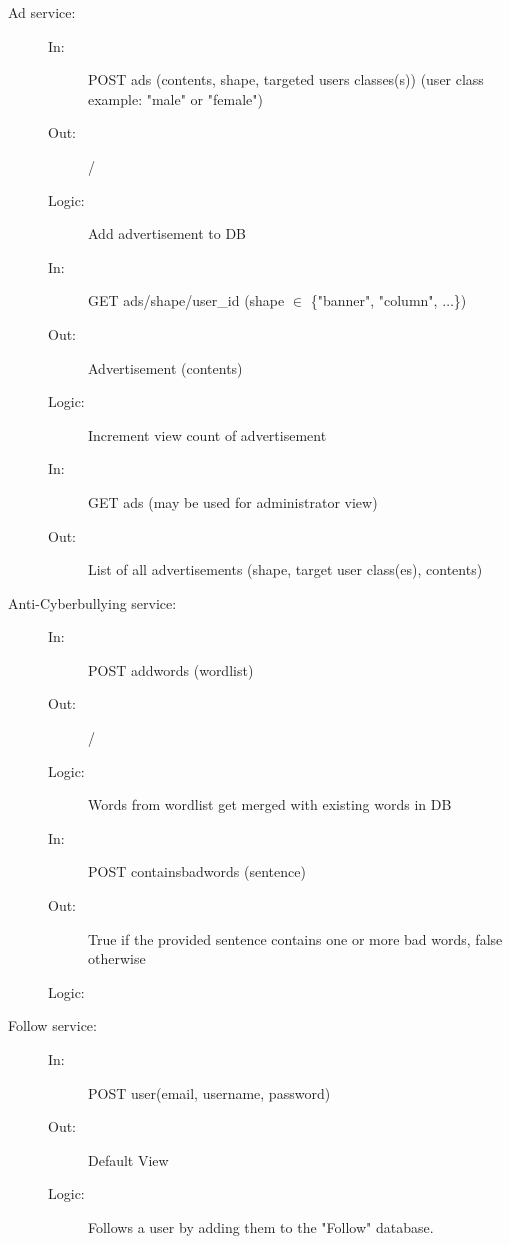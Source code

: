 \documentclass{article}
\begin{document}
\begin{description}
    \item [Ad service:] 
    \begin{description}
        \item[]
        \item[In:] POST ads (contents, shape, targeted users classes(s)) (user class example: "male" or "female")
        \item[Out:] /
        \item[Logic:] Add advertisement to DB
        \item[]
        
        \item[In:] GET ads/shape/user\_id (shape $\in$ \{"banner", "column", $\dots$\})
        \item[Out:] Advertisement (contents)
        \item[Logic:] Increment view count of advertisement
        \item[]
        
		\item[In:] GET ads (may be used for administrator view)
        \item[Out:] List of all advertisements (shape, target user class(es), contents)
    \end{description}
\end{description}

\begin{description}
    \item [Anti-Cyberbullying service:] 
    \begin{description}
        \item[]
        \item[In:] POST addwords (wordlist)
        \item[Out:] /
        \item[Logic:] Words from wordlist get merged with existing words in DB
        \item[]
        
        \item[In:] POST containsbadwords (sentence)
        \item[Out:] True if the provided sentence contains one or more bad words, false otherwise
        \item[Logic:] 
    \end{description}
\end{description}

\begin{description}
    \item [Follow service:] 
    \begin{description}
        \item[]
        \item[In:] POST user(email, username, password)
        \item[Out:] Default View
        \item[Logic:] Follows a user by adding them to the "Follow" database.
        \item[]
    \end{description}
\end{description}
\end{document}
